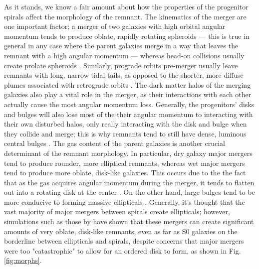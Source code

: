 \documentclass[twocolumn]{aastex631}
\begin{document}
As it stands, we know a fair amount about how the properties of the progenitor spirals affect the morphology of the remnant.
The kinematics of the merger are one important factor; a merger of two galaxies with high orbital angular momentum tends to produce oblate, rapidly rotating spheroids --- this is true in general in any case where the parent galaxies merge in a way that leaves the remnant with a high angular momentum --- whereas head-on collisions usually create prolate spheroids \citep{Barnes+1992}. 
Similarly, prograde orbits pre-merger usually leave remnants with long, narrow tidal tails, as opposed to the shorter, more diffuse plumes associated with retrograde orbits \citep{Duc2013}. 
The dark matter halos of the merging galaxies also play a vital role in the merger, as their interactions with each other actually cause the most angular momentum loss. 
Generally, the progenitors' disks and bulges will also lose most of the their angular momentum to interacting with their own disturbed halos, only really interacting with the disk and bulge when they collide and merge; this is why remnants tend to still have dense, luminous central bulges \citep{Barnes+1992}.
The gas content of the parent galaxies is another crucial determinant of the remnant morphology.
In particular, dry galaxy major mergers tend to produce rounder, more elliptical remnants, whereas wet major mergers tend to produce more oblate, disk-like galaxies.
This occurs due to the the fact that as the gas acquires angular momentum during the merger, it tends to flatten out into a rotating disk at the center \citep{Eliche-Moral+2018}.
On the other hand, large bulges tend to be more conducive to forming massive ellipticals \citep{Barnes+1992}.
Generally, it's thought that the vast majority of major mergers between spirals create ellipticals; however, simulations such as those by \cite{Eliche-Moral+2018} have shown that these mergers can create significant amounts of very oblate, disk-like remnants, even as far as S0 galaxies on the borderline between ellipticals and spirals, despite concerns that major mergers were too "catastrophic" to allow for an ordered disk to form, as shown in Fig. \ref{fig:morphs}.
\end{document}

